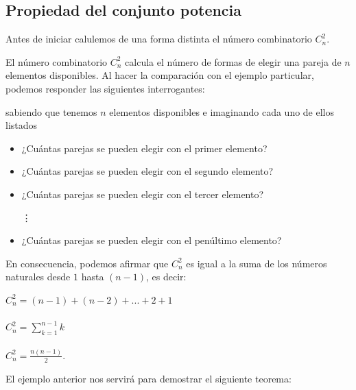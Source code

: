\documentclass[12pt]{article}
\begin{document}
\subsection{Propiedad del conjunto potencia}

\begin{ejemplo}
    
Antes de iniciar calulemos de una forma distinta el número combinatorio $C^{2}_{n}$.

\end{ejemplo}

\begin{solucion}
    
El número combinatorio $C^{2}_{n}$ calcula el número de formas de elegir una pareja de $n$ elementos disponibles. Al hacer la comparación con el ejemplo particular, podemos responder las siguientes interrogantes: 

sabiendo que tenemos $n$ elementos disponibles e imaginando cada uno de ellos listados

\begin{itemize}
    \item ¿Cuántas parejas se pueden elegir con el primer elemento?
    \item ¿Cuántas parejas se pueden elegir con el segundo elemento?
    \item ¿Cuántas parejas se pueden elegir con el tercer elemento?
    
    \qquad \qquad \qquad \qquad \qquad \qquad \vdots
    
    \item ¿Cuántas parejas se pueden elegir con el penúltimo elemento?
\end{itemize}

En consecuencia, podemos afirmar que $C^{2}_{n}$ es igual a la suma de los números naturales desde $1$ hasta $(n-1)$, es decir:

\begin{center}
    $C^{2}_{n} = (n-1) + (n-2) + ... + 2 + 1$ \\ \hfill \\
    $C^{2}_{n} = \displaystyle\sum_{k=1}^{n-1} k$ \\ \hfill \\
    $C^{2}_{n} = \frac{n (n-1)}{2}$.
\end{center}

\end{solucion}

El ejemplo anterior nos servirá para demostrar el siguiente teorema:
\end{document}
